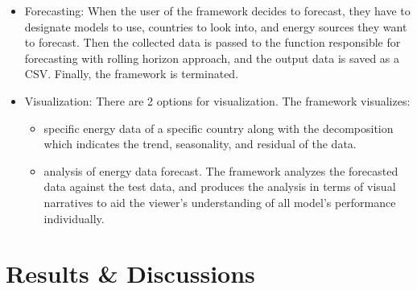 \documentclass[]{usiinfbachelorproject}
\begin{document}
\begin{itemize}
 \item Forecasting: When the user of the framework decides to forecast, they have to designate models to use, countries to look into, and energy sources they want to forecast. Then the collected data is passed to the function responsible for forecasting with rolling horizon approach, and the output data is saved as a CSV. Finally, the framework is terminated.\\
 \item Visualization: There are 2 options for visualization. The framework visualizes:
 \begin{itemize}
  \item specific energy data of a specific country along with the decomposition which indicates the trend, seasonality, and residual of the data.
  \item analysis of energy data forecast. The framework analyzes the forecasted data against the test data, and produces the analysis in terms of visual narratives to aid the viewer's understanding of all model's performance individually.\\
 \end{itemize}

 \end{itemize}
 
\section{Results \& Discussions}

\newpage



\end{document}
